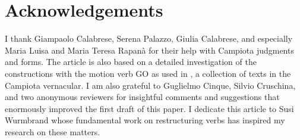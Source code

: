 \documentclass[output=paper]{langscibook}
\begin{document}
\section*{Acknowledgements}

I thank Giampaolo Calabrese, Serena Palazzo, Giulia Calabrese, and especially Maria Luisa and Maria Teresa Rapanà for their help with Campiota judgments and forms. The article is also based on a detailed investigation of the constructions with the motion verb GO as used in \citet{Todaro1989}, a collection of texts in the Campiota vernacular. I am also grateful to Guglielmo Cinque, Silvio Cruschina, and two anonymous reviewers for insightful comments and suggestions that enormously improved the first draft of this paper. I dedicate this article to Susi Wurmbrand whose fundamental work on restructuring verbs has inspired my research on these matters.

{\sloppy
    \printbibliography[heading=subbibliography,notkeyword=this]
}
\end{document}
